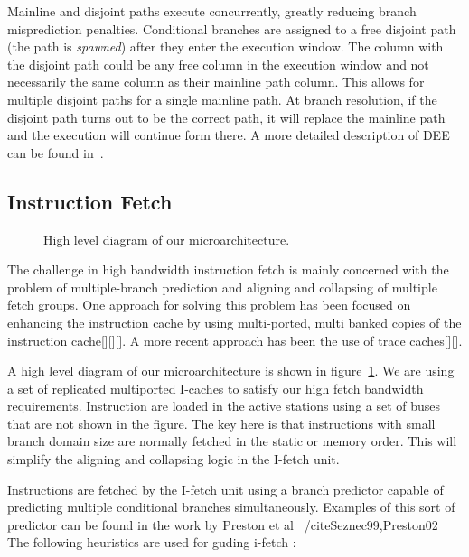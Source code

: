 \documentclass[10pt,twocolumn]{IEEEtran}
\begin{document}
Mainline and disjoint paths execute concurrently, greatly reducing
branch misprediction penalties.  Conditional branches are assigned to a
free disjoint path (the path is \emph{spawned}) after they enter the
execution window.  The column with the disjoint path could be any free
column in the execution window and not necessarily the same column as
their mainline path column. This allows for multiple disjoint paths for
a single mainline path.  At branch resolution,  if the disjoint path
turns out to be the correct path, it will replace the mainline path and
the execution will continue form there. 
A more detailed description of DEE
can be found in~\cite{Uht95}.

\subsection {Instruction Fetch}

\begin{figure}
{}
\caption{High level diagram of our microarchitecture.}
\label{fig:highlevel}
\end{figure}  
 
The challenge in high bandwidth instruction fetch is mainly concerned
with the problem of multiple-branch prediction and aligning and
collapsing of multiple fetch groups.  One approach for solving this
problem has been focused on enhancing the instruction cache by using
multi-ported, multi banked copies of the instruction cache[][][].  
A more recent approach has been the use of trace caches[][].

A high level diagram of our microarchitecture is shown in
figure~\ref{fig:highlevel}.  We are using a set of replicated
multiported I-caches to satisfy our high fetch bandwidth requirements.
Instruction are loaded in the active stations using a set of
buses that are not shown in the figure.  
The key here is that instructions with small branch domain size
are normally fetched in the static or memory order.  This will simplify
the aligning and collapsing logic in the I-fetch unit.

Instructions are fetched by the I-fetch unit using a branch
predictor capable of predicting multiple conditional
branches simultaneously.
Examples of this sort of predictor can be found in the work by
Preston et al ~/cite{Seznec99,Preston02} 
The following heuristics are used for guding i-fetch :
\end{document}
